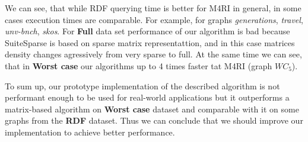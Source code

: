 We can see, that while RDF querying time is better for M4RI in general, in some cases execution times are comparable. For example, for graphs \textit{generations}, \textit{travel},  \textit{unv-bnch}, \textit{skos}.
For \textbf{Full} data set performance of our algorithm is bad because SuiteSparse is based on sparse matrix representattion, and in this case matrices density changes agressively from very sparse to full.
At the same time we can see, that in \textbf{Worst case} our algorithms up to 4 times faster tat M4RI (graph $WC_5$).

To sum up, our prototype implementation of the described algorithm is not performant enough to be used for real-world applications but it outperforms a matrix-based algorithm on \textbf{Worst case} dataset and comparable with it on some graphs from the \textbf{RDF} dataset. Thus we can conclude that we should improve our implementation to achieve better performance.

